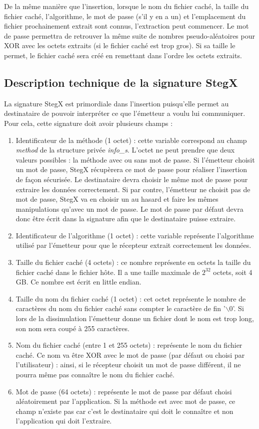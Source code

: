 \documentclass[11pt]{article}
\begin{document}
De la même manière que l'insertion, lorsque le nom du fichier caché, la taille 
du fichier caché, l'algorithme, le mot de passe (s'il y en a un) et l'emplacement
du fichier prochainement extrait sont connus, l'extraction peut commencer. 
Le mot de passe permettra de retrouver la même suite de nombres pseudo-aléatoires 
pour XOR avec les octets extraits (si le fichier caché est trop gros). 
Si sa taille le permet, le fichier caché sera créé en remettant dans l'ordre 
les octets extraits. 

\subsection{Description technique de la signature StegX}

La signature StegX est primordiale dans l'insertion puisqu'elle permet au 
destinataire de pouvoir interpréter ce que l'émetteur a voulu lui communiquer. 
Pour cela, cette signature doit avoir plusieurs champs : 
\begin {enumerate}
\item Identificateur de la méthode (1 octet) : cette variable correspond au 
champ \textit{method} de la structure privée \textit{info\_s}. L'octet ne 
peut prendre que deux valeurs possibles : la méthode avec ou sans mot de 
passe. Si l'émetteur choisit un mot de passe, StegX récupèrera ce mot de 
passe pour réaliser l'insertion de façon sécurisée. Le destinataire devra 
choisir le même mot de passe pour extraire les données correctement. 
Si par contre, l'émetteur ne choisit pas de mot de passe, StegX va en choisir 
un au hasard et faire les mêmes manipulations qu'avec un mot de passe. 
Le mot de passe par défaut devra donc être écrit dans la signature afin que 
le destinataire puisse extraire. 
\item Identificateur de l'algorithme (1 octet) : cette variable représente 
l'algorithme utilisé par l'émetteur pour que le récepteur extrait correctement 
les données. 
\item Taille du fichier caché (4 octets) : ce nombre représente en octets 
la taille du fichier caché dans le fichier hôte. Il a une taille maximale 
de $2^{32}$ octets, soit 4 GB. Ce nombre est écrit en little endian. 
\item Taille du nom du fichier caché (1 octet) : cet octet représente le 
nombre de caractères du nom du fichier caché sans compter le caractère de 
fin '$\backslash$0'. Si lors de la dissimulation l'émetteur donne un fichier 
dont le nom est trop long, son nom sera coupé à 255 caractères. 
\item Nom du fichier caché (entre 1 et 255 octets) : représente le nom du 
fichier caché. Ce nom va être XOR avec le mot de passe (par défaut ou choisi
par l'utilisateur) : ainsi, si le récepteur choisit un mot de passe différent, 
il ne pourra même pas connaître le nom du fichier caché. 
\item Mot de passe (64 octets) : représente le mot de passe par défaut choisi 
aléatoirement par l'application. Si la méthode est avec mot de passe, 
ce champ n'existe pas car c'est le destinataire qui doit le connaître et 
non l'application qui doit l'extraire. 
\end{enumerate}
\end{document}
